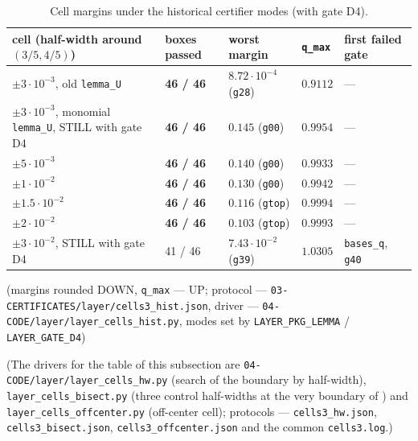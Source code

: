 \begin{table}[ht]
\centering
\caption{Cell margins under the historical certifier modes (with gate D4).}
\label{tab:cell-margins-d4}
{\small\setlength{\tabcolsep}{4pt}
\begin{tabular}{>{\raggedright\arraybackslash}p{}llll}
\hline
cell (half-width around $(3/5, 4/5)$) & boxes passed & worst margin & \texttt{q\_max} & first failed gate \\
\hline
$\pm 3\cdot 10^{-3}$, old \texttt{lemma\_U} & \textbf{46 / 46} & $8.72\cdot 10^{-4}$ (\texttt{g28}) & $0.9112$ & --- \\
$\pm 3\cdot 10^{-3}$, monomial \texttt{lemma\_U}, STILL with gate D4 & \textbf{46 / 46} & $0.145$ (\texttt{g00}) & $0.9954$ & --- \\
$\pm 5\cdot 10^{-3}$ & \textbf{46 / 46} & $0.140$ (\texttt{g00}) & $0.9933$ & --- \\
$\pm 1\cdot 10^{-2}$ & \textbf{46 / 46} & $0.130$ (\texttt{g00}) & $0.9942$ & --- \\
$\pm 1.5\cdot 10^{-2}$ & \textbf{46 / 46} & $0.116$ (\texttt{gtop}) & $0.9994$ & --- \\
$\pm 2\cdot 10^{-2}$ & \textbf{46 / 46} & $\mathbf{0.103}$ (\texttt{gtop}) & $0.9993$ & --- \\
$\pm 3\cdot 10^{-2}$, STILL with gate D4 & 41 / 46 & $7.43\cdot 10^{-2}$ (\texttt{g39}) & $1.0305$ & \texttt{bases\_q}, \texttt{g40} \\
\hline
\end{tabular}}
\end{table}

(margins rounded DOWN, \texttt{q\_max} --- UP; protocol ---
\texttt{03-\allowbreak CERTIFICATES/\allowbreak layer/\allowbreak cells3\_\allowbreak hist.json}, driver ---
\texttt{04-\allowbreak CODE/\allowbreak layer/\allowbreak layer\_\allowbreak cells\_\allowbreak hist.py}, modes set by \texttt{LAYER\_\allowbreak PKG\_\allowbreak LEMMA} /
\texttt{LAYER\_\allowbreak GATE\_\allowbreak D4})

(The drivers for the table of this subsection are
\texttt{04-\allowbreak CODE/\allowbreak layer/\allowbreak layer\_\allowbreak cells\_\allowbreak hw.py} (search of the boundary by half-width),
\texttt{layer\_\allowbreak cells\_\allowbreak bisect.py} (three control half-widths at the very boundary of
\Qcell) and \texttt{layer\_\allowbreak cells\_\allowbreak offcenter.py} (off-center cell); protocols ---
\texttt{cells3\_\allowbreak hw.json}, \texttt{cells3\_\allowbreak bisect.json},
\texttt{cells3\_\allowbreak offcenter.json} and the common \texttt{cells3.log}.)

